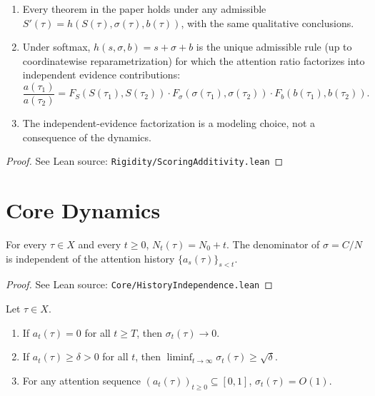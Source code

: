\begin{proposition}
\label{prop:scoring_additivity}
\leanok
{}
\leavevmode
\begin{enumerate}
\item Every theorem in the paper holds under any admissible $S'(\tau) = h(S(\tau), \sigma(\tau), b(\tau))$, with the same qualitative conclusions.
\item Under softmax, $h(s,\sigma,b) = s + \sigma + b$ is the unique admissible rule (up to coordinatewise reparametrization) for which the attention ratio factorizes into independent evidence contributions:
\[
\frac{a(\tau_1)}{a(\tau_2)} = F_S(S(\tau_1), S(\tau_2))\cdot F_\sigma(\sigma(\tau_1), \sigma(\tau_2))\cdot F_b(b(\tau_1), b(\tau_2)).
\]
\item The independent-evidence factorization is a modeling choice, not a consequence of the dynamics.
\end{enumerate}
\end{proposition}

\begin{proof}
\leanok
{}
See Lean source: \texttt{Rigidity/ScoringAdditivity.lean}
\end{proof}

\chapter{Core Dynamics}\label{ch:core}

\begin{corollary}
\label{cor:N_history_independent}
\leanok
{}
For every $\tau \in X$ and every $t \geq 0$, $N_t(\tau) = N_0 + t$.  The denominator of $\sigma = C/N$ is independent of the attention history $\{a_s(\tau)\}_{s < t}$.
\end{corollary}

\begin{proof}
\leanok
{}
See Lean source: \texttt{Core/HistoryIndependence.lean}
\end{proof}

\begin{theorem}
\label{thm:selective}
\leanok
{}
Let $\tau \in X$.
\begin{enumerate}
\item If $a_t(\tau) = 0$ for all $t \geq T$, then $\sigma_t(\tau) \to 0$.
\item If $a_t(\tau) \geq \delta > 0$ for all $t$, then $\liminf_{t \to \infty} \sigma_t(\tau) \geq \sqrt{\delta}$.
\item For any attention sequence $(a_t(\tau))_{t \geq 0} \subseteq [0,1]$, $\sigma_t(\tau) = O(1)$.
\end{enumerate}
\end{theorem}


